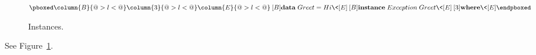 \documentclass{article}
\let\hspre\empty
\let\hspost\empty
\newenvironment{plainhscode}{\par\(\pboxed}{\endpboxed\)\par}
\begin{document}
\begin{figure}
\begin{plainhscode}
\column{B}{@{}>{\hspre}l<{\hspost}@{}}%
\column{3}{@{}>{\hspre}l<{\hspost}@{}}%
\column{E}{@{}>{\hspre}l<{\hspost}@{}}%
\>[B]{}\mathbf{data}\;Greet\mathrel{=}Hi{}\<[E]%
\\
\>[B]{}\mathbf{instance}\;Exception\;Greet{}\<[E]%
\\
\>[3]{}\mathbf{where}{}\<[E]%
\end{plainhscode}
\caption{Instances.}\label{fig:greet}
\end{figure}
See Figure~\ref{fig:greet}.
\end{document}
